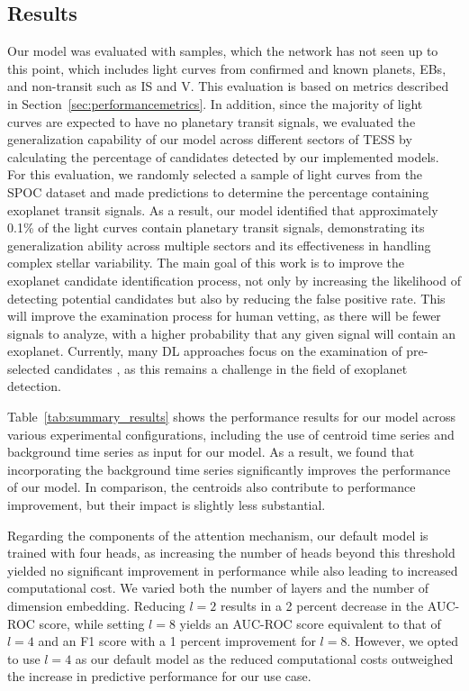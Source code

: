 \subsection{Results}
\label{sec:results_nn}
Our model was evaluated with samples, which the network has not seen up to this point, which includes light curves from confirmed and known planets, EBs, and non-transit such as IS and V. This evaluation is based on metrics described in Section~\ref{sec:performancemetrics}. In addition, since the majority of light curves are expected to have no planetary transit signals, we evaluated the generalization capability of our model across different sectors of TESS by calculating the percentage of candidates detected by our implemented models. For this evaluation, we randomly selected a sample of light curves from the SPOC dataset and made predictions to determine the percentage containing exoplanet transit signals. As a result, our model identified that approximately 0.1\% of the light curves contain planetary transit signals, demonstrating its generalization ability across multiple sectors and its effectiveness in handling complex stellar variability. The main goal of this work is to improve the exoplanet candidate identification process, not only by increasing the likelihood of detecting potential candidates but also by reducing the false positive rate. This will improve the examination process for human vetting, as there will be fewer signals to analyze, with a higher probability that any given signal will contain an exoplanet. Currently, many DL approaches focus on the examination of pre-selected candidates \citep{valizadegan2022exominer}, as this remains a challenge in the field of exoplanet detection. \par

Table~\ref{tab:summary_results} shows the performance results for our model across various experimental configurations, including the use of centroid time series and background time series as input for our model. As a result, we found that incorporating the background time series significantly improves the performance of our model. In comparison, the centroids also contribute to performance improvement, but their impact is slightly less substantial. \par

Regarding the components of the attention mechanism, our default model is trained with four heads, as increasing the number of heads beyond this threshold yielded no significant improvement in performance while also leading to increased computational cost. We varied both the number of layers and the number of dimension embedding. Reducing $l = 2$ results in a 2 percent decrease in the AUC-ROC score, while setting $l = 8$ yields an AUC-ROC score equivalent to that of $l = 4$ and an F1 score with a 1 percent improvement for $l=8$. However, we opted to use $l=4$ as our default model as the reduced computational costs outweighed the increase in predictive performance for our use case. 

